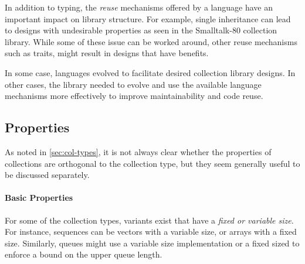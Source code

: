 \documentclass[sigconf, 10pt]{acmart}
\begin{document}
In addition to typing, the \emph{reuse} mechanisms offered by a language have
an important impact on library structure.
For example, single inheritance can lead to designs with undesirable
properties as seen in the Smalltalk-80 collection library\citep{Cook:1992:ISS}.
While some of these issue can be worked around,
other reuse mechanisms such as traits,
might result in designs that have benefits\citep{Black:2003:ATS}.

In some case, languages evolved to facilitate
desired collection library designs\citep{Chakravarty:2005:ATC,Garcia:2007}.
In other cases,
the library needed to evolve
and use the available language mechanisms more effectively
to improve maintainability and code reuse\citep{Odersky:2009}.



\subsection{Properties}
\label{sec:col-properties}

As noted in \cref{sec:col-types},
it is not always clear whether the properties of collections are orthogonal
to the collection type,
but they seem generally useful to be discussed separately.

\paragraph{Basic Properties}

For some of the collection types,
variants exist that have a \emph{fixed or variable size}.
For instance, sequences can be vectors with a variable size,
or arrays with a fixed size.
Similarly, queues might use a variable size implementation or a fixed sized to
enforce a bound on the upper queue length.
\end{document}
